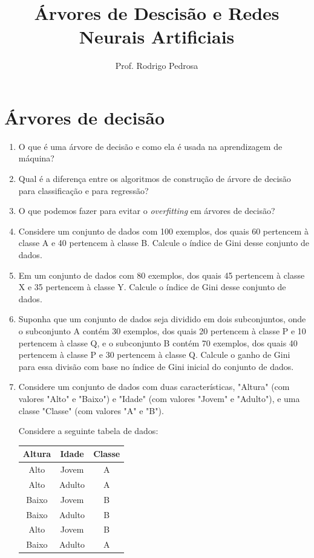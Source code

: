 \documentclass{article}
\title{Árvores de Descisão e Redes Neurais Artificiais}
\author{Prof. Rodrigo Pedrosa}
\begin{document}
\maketitle

\vspace{-1.2cm}

\section{Árvores de decisão}

    \begin{enumerate}

    \item O que é uma árvore de decisão e como ela é usada na aprendizagem de máquina?

    \item Qual é a diferença entre os algoritmos de construção de árvore de decisão para classificação e para regressão?

    \item O que podemos fazer para evitar o \textit{overfitting} em árvores de decisão?

    \item Considere um conjunto de dados com 100 exemplos, dos quais 60 pertencem à classe A e 40 pertencem à classe B. Calcule o índice de Gini desse conjunto de dados.

    \item Em um conjunto de dados com 80 exemplos, dos quais 45 pertencem à classe X e 35 pertencem à classe Y. Calcule o índice de Gini desse conjunto de dados.

    \item Suponha que um conjunto de dados seja dividido em dois subconjuntos, onde o subconjunto A contém 30 exemplos, dos quais 20 pertencem à classe P e 10 pertencem à classe Q, e o subconjunto B contém 70 exemplos, dos quais 40 pertencem à classe P e 30 pertencem à classe Q. Calcule o ganho de Gini para essa divisão com base no índice de Gini inicial do conjunto de dados.

   \item Considere um conjunto de dados com duas características, "Altura" (com valores "Alto" e "Baixo") e "Idade" (com valores "Jovem" e "Adulto"), e uma classe "Classe" (com valores "A" e "B"). 
   
   Considere a seguinte tabela de dados:

    \begin{center}
    \begin{tabular}{ |c|c|c| }
    \hline
    Altura & Idade & Classe \\
    \hline
    Alto & Jovem & A \\
    Alto & Adulto & A \\
    Baixo & Jovem & B \\
    Baixo & Adulto & B \\
    Alto & Jovem & B \\
    Baixo & Adulto & A \\
    \hline
    \end{tabular}
    \end{center}
   

\end{enumerate}
\end{document}
